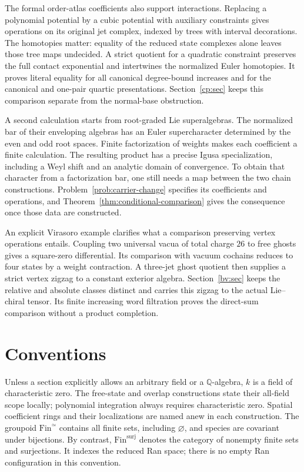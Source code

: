 \documentclass[11pt,reqno]{amsart}
\theoremstyle{definition}
\theoremstyle{remark}
\providecommand{\Fin}{\mathrm{Fin}}
\begin{document}
The formal order-atlas coefficients also support interactions.
Replacing a polynomial potential by a cubic potential with auxiliary
constraints gives operations on its original jet complex, indexed by
trees with interval decorations.  The homotopies matter: equality of
the reduced state complexes alone leaves those tree maps undecided.
A strict quotient for a quadratic constraint preserves the full contact
exponential and intertwines the normalized Euler homotopies.  It proves
literal equality for all canonical degree-bound increases and for the
canonical and one-pair quartic presentations.  Section~\ref{cp:sec}
keeps this comparison separate from the normal-base obstruction.

A second calculation starts from root-graded Lie superalgebras.
The normalized bar of their enveloping algebras has an Euler
supercharacter determined by the even and odd root spaces.
Finite factorization of weights makes each coefficient a finite
calculation.  The resulting product has a precise Igusa specialization,
including a Weyl shift and an analytic domain of convergence.
To obtain that character from a factorization bar, one still needs a map
between the two chain constructions.  Problem~\ref{prob:carrier-change}
specifies its coefficients and operations, and
Theorem~\ref{thm:conditional-comparison} gives the consequence once those
data are constructed.

An explicit Virasoro example clarifies what a comparison preserving
vertex operations entails.  Coupling two universal vacua of total
charge \(26\) to free ghosts gives a square-zero differential.
Its comparison with vacuum cochains reduces to four states by a
weight contraction.  A three-jet ghost quotient then supplies a strict
vertex zigzag to a constant exterior algebra.  Section~\ref{bv:sec}
keeps the relative and absolute classes distinct and carries this
zigzag to the actual Lie--chiral tensor.  Its finite increasing word
filtration proves the direct-sum comparison without a product completion.

\section{Conventions}

Unless a section explicitly allows an arbitrary field or a
\(\mathbb Q\)-algebra, \(k\) is a field of characteristic zero.
The free-state and overlap constructions state their all-field scope
locally; polynomial integration always requires characteristic zero.
Spatial coefficient rings and their localizations are named anew in
each construction.  The groupoid
\(\Fin^{\simeq}\) contains all finite sets, including
\(\varnothing\), and species are covariant under bijections.  By
contrast, \(\Fin^{\mathrm{surj}}\) denotes the category of nonempty
finite sets and surjections.  It indexes the reduced Ran space; there
is no empty Ran configuration in this convention.
\end{document}

